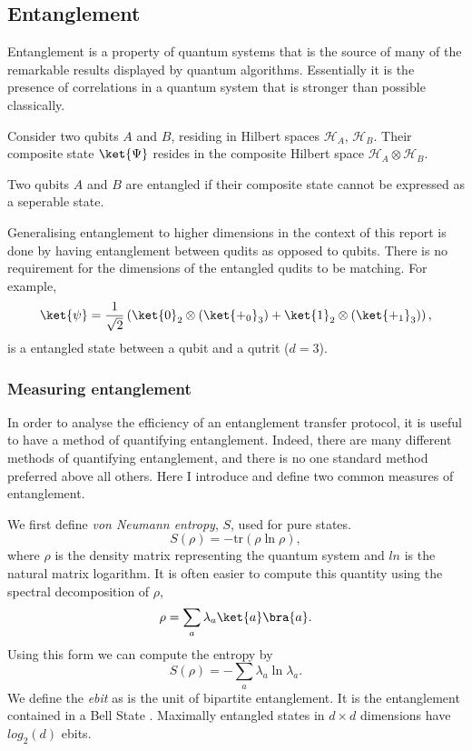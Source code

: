 \subsection{Entanglement}
Entanglement is a property of quantum systems that is the source of many of the remarkable results displayed by quantum algorithms. Essentially it is the presence of correlations in a quantum system that is stronger than possible classically. 
\begin{definition}
    Consider two qubits $A$ and $B$, residing in Hilbert spaces $\mathcal{H}_A$, $\mathcal{H}_B$. Their composite state $\ket{\Psi}$ resides in the composite Hilbert space $\mathcal{H}_A \otimes \mathcal{H}_B$.
\end{definition}
\begin{definition}
    Two qubits $A$ and $B$ are entangled if their composite state cannot be expressed as a seperable state.
\end{definition}
Generalising entanglement to higher dimensions in the context of this report is done by having entanglement between qudits as opposed to qubits. There is no requirement for the dimensions of the entangled qudits to be matching. For example,
\begin{equation}
    \ket{\psi} = \frac{1}{\sqrt{2}}\left(\ket{0}_2\otimes\left(\ket{+_0}_3\right) + \ket{1}_2\otimes\left(\ket{+_1}_3\right)\right),
\end{equation}
is a entangled state between a qubit and a qutrit ($d=3$).

\subsubsection{Measuring entanglement}
In order to analyse the efficiency of an entanglement transfer protocol, it is useful to have a method of quantifying entanglement.
Indeed, there are many different methods of quantifying entanglement, and there is no one standard method preferred above all others.
Here I introduce and define two common measures of entanglement.\newline

We first define \emph{von Neumann entropy}, $S$, used for pure states.
\begin{equation}
    S(\rho) = -\text{tr}(\rho \ln \rho),
\end{equation}
where $\rho$ is the density matrix representing the quantum system and $ln$ is the natural matrix logarithm. 
It is often easier to compute this quantity using the spectral decomposition of $\rho$,
\begin{equation}
    \rho = \sum_a \lambda_a \ket{a}\bra{a}.
\end{equation}
Using this form we can compute the entropy by
\begin{equation}
    S(\rho) = -\sum_a \lambda_a \ln\lambda_a.
\end{equation}
We define the \emph{ebit} as is the unit of bipartite entanglement. It is the entanglement contained in a Bell State \cite{Eisert_2000}. Maximally entangled states in $d \times d$ dimensions have $log_2(d)$ ebits.

